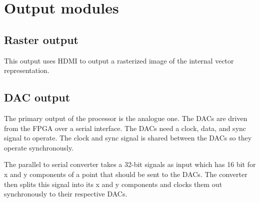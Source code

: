 \chapter{Output modules}

\section{Raster output}

This output uses HDMI to output a rasterized image of the internal vector representation.

\section{DAC output}

The primary output of the processor is the analogue one. The DACs are driven from the FPGA over a serial interface. The DACs need a clock, data, and sync signal to operate. The clock and sync signal is shared between the DACs so they operate synchronously. 

The parallel to serial converter takes a 32-bit signals as input which has 16 bit for x and y components of a point that should be sent to the DACs. The converter then splits this signal into its x and y components and clocks them out synchronously to their respective DACs.